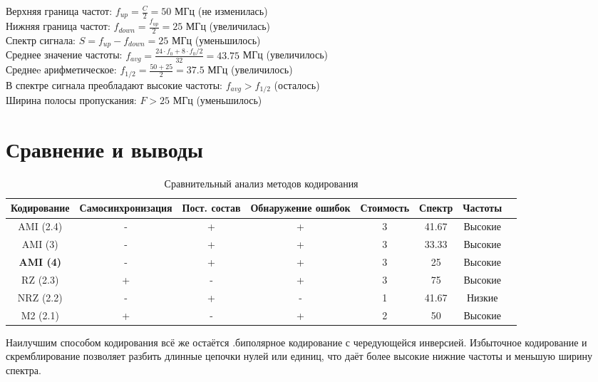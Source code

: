 \documentclass{article}
\begin{document}
Верхняя граница частот: $f_{up} = \frac{C}{2} = 50$ МГц (не изменилась)
\\
Нижняя граница частот: $f_{down} = \frac{f_{up}}{2} = 25$ МГц (увеличилась)
\\
Спектр сигнала: $S = f_{up} - f_{down} = 25$ МГц (уменьшилось)
\\
Среднее значение частоты: $f_{avg} = \frac{24\cdot f_0 + 8\cdot f_0/2}{32} = 43.75$ МГц (увеличилось)
\\
Среднеe арифметическое: $f_{1/2} = \frac{50 + 25}{2} = 37.5$ МГц (увеличилось)
\\
В спектре сигнала преобладают высокие частоты: $f_{avg} > f_{1/2}$ (осталось)
\\
Ширина полосы пропускания: $F > 25$ МГц (уменьшилось)
\section{Сравнение и выводы}

\begin{table}[H]
    \centering
    \caption{Сравнительный анализ методов кодирования}
    \begin{tabular}{|c|c|c|c|c|c|c|c|}
        \hline
        Кодирование & Самосинхронизация & Пост. состав & Обнаружение ошибок & Стоимость & Спектр & Частоты \\
        \hline
        AMI (2.4) & - & + & + & 3 & 41.67 & Высокие  \\
        \hline
        AMI (3) & - & + & + & 3 & 33.33 & Высокие  \\
        \hline
        \textbf{AMI (4)} & - & + & + & 3 & 25 & Высокие  \\
        \hline
        RZ (2.3) & + & - & + & 3 & 75 & Высокие  \\
        \hline
        NRZ (2.2) & - & + & - & 1 & 41.67 & Низкие  \\
        \hline
        M2 (2.1) & + & - & + & 2 & 50 & Высокие  \\
        \hline
    \end{tabular}
    \label{tab:coding_comparison}
\end{table}

Наилучшим способом кодирования всё же остаётся .биполярное кодирование с чередующейся инверсией. Избыточное кодирование и скремблирование позволяет разбить длинные цепочки нулей или единиц, что даёт более высокие нижние частоты и меньшую ширину спектра.
\end{document}
